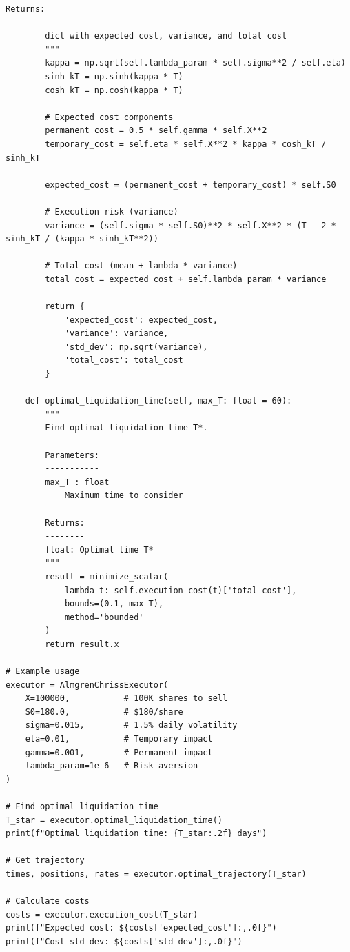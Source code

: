 \documentclass[11pt,a4paper]{article}
\begin{document}
\begin{lstlisting}[caption=Almgren-Chriss Implementation]
        Returns:
        --------
        dict with expected cost, variance, and total cost
        """
        kappa = np.sqrt(self.lambda_param * self.sigma**2 / self.eta)
        sinh_kT = np.sinh(kappa * T)
        cosh_kT = np.cosh(kappa * T)

        # Expected cost components
        permanent_cost = 0.5 * self.gamma * self.X**2
        temporary_cost = self.eta * self.X**2 * kappa * cosh_kT / sinh_kT

        expected_cost = (permanent_cost + temporary_cost) * self.S0

        # Execution risk (variance)
        variance = (self.sigma * self.S0)**2 * self.X**2 * (T - 2 * sinh_kT / (kappa * sinh_kT**2))

        # Total cost (mean + lambda * variance)
        total_cost = expected_cost + self.lambda_param * variance

        return {
            'expected_cost': expected_cost,
            'variance': variance,
            'std_dev': np.sqrt(variance),
            'total_cost': total_cost
        }

    def optimal_liquidation_time(self, max_T: float = 60):
        """
        Find optimal liquidation time T*.

        Parameters:
        -----------
        max_T : float
            Maximum time to consider

        Returns:
        --------
        float: Optimal time T*
        """
        result = minimize_scalar(
            lambda t: self.execution_cost(t)['total_cost'],
            bounds=(0.1, max_T),
            method='bounded'
        )
        return result.x

# Example usage
executor = AlmgrenChrissExecutor(
    X=100000,           # 100K shares to sell
    S0=180.0,           # $180/share
    sigma=0.015,        # 1.5% daily volatility
    eta=0.01,           # Temporary impact
    gamma=0.001,        # Permanent impact
    lambda_param=1e-6   # Risk aversion
)

# Find optimal liquidation time
T_star = executor.optimal_liquidation_time()
print(f"Optimal liquidation time: {T_star:.2f} days")

# Get trajectory
times, positions, rates = executor.optimal_trajectory(T_star)

# Calculate costs
costs = executor.execution_cost(T_star)
print(f"Expected cost: ${costs['expected_cost']:,.0f}")
print(f"Cost std dev: ${costs['std_dev']:,.0f}")
\end{lstlisting}
\end{document}
